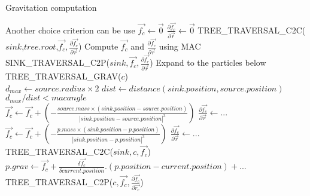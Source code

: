 \documentclass{article}
\begin{document}
\begin{algorithm}
\caption{Gravitation computation}\label{comp_grav}
\begin{algorithmic}[1]
\Comment Another choice criterion can be use
	\State $\vec{f_c} \leftarrow \vec{0}$
	\State $\frac{\partial \vec{f_c}}{\partial \vec{r}} \leftarrow \vec{0}$
	\State TREE\_TRAVERSAL\_C2C($sink$,$tree.root$,$\vec{f_c},\frac{\partial \vec{f_c}}{\partial \vec{r}}$)
	\Comment Compute $\vec{f_c}$ and $\frac{\partial \vec{f_c}}{\partial \vec{r}}$ using MAC
	\State SINK\_TRAVERSAL\_C2P($sink,\vec{f_c},\frac{\partial \vec{f_c}}{\partial \vec{r}}$)
	\Comment Expand to the particles below
\Else
{}
	\State TREE\_TRAVERSAL\_GRAV($c$)
\EndFor
\EndIf
\EndProcedure
\\
\State $d_{max} \leftarrow source.radius\times 2 $
\State $dist \leftarrow distance(sink.position,source.position)$
\State \Return $d_{max}/dist < macangle$
\EndFunction
\\
	\State $\vec{f_c} \leftarrow \vec{f_c} + (- \frac{source.mass\times (sink.position - source.position) }{ |sink.position - source.position|^3} )$
	\State $ \frac{\partial \vec{f_c}}{\partial \vec{r}} \leftarrow ... $
\Else
{}
	\State $\vec{f_c} \leftarrow \vec{f_c} + (- \frac{p.mass\times (sink.position - p.position) }{ |sink.position - p.position|^3} )$
	\State $ \frac{\partial \vec{f_c}}{\partial \vec{r}} \leftarrow ... $
\EndFor
\Else
	\State TREE\_TRAVERSAL\_C2C($sink,c,\vec{f_c}$)
\EndFor
\EndIf
\EndIf
\EndProcedure
\\
		\State $p.grav \leftarrow \vec{f_c}+\frac{\delta \vec{f_c}}{\delta current.position}.(p.position-current.position) + ...$
	\EndFor
\Else
		\State TREE\_TRAVERSAL\_C2P($ c, \vec{f_c}, \frac{\partial \vec{f_c}}{\partial \vec{r_c}}$)
	\EndFor
\EndIf
\EndProcedure
\end{algorithmic}
\end{algorithm}


\nocite{*}



\newpage
\appendix
\end{document}
